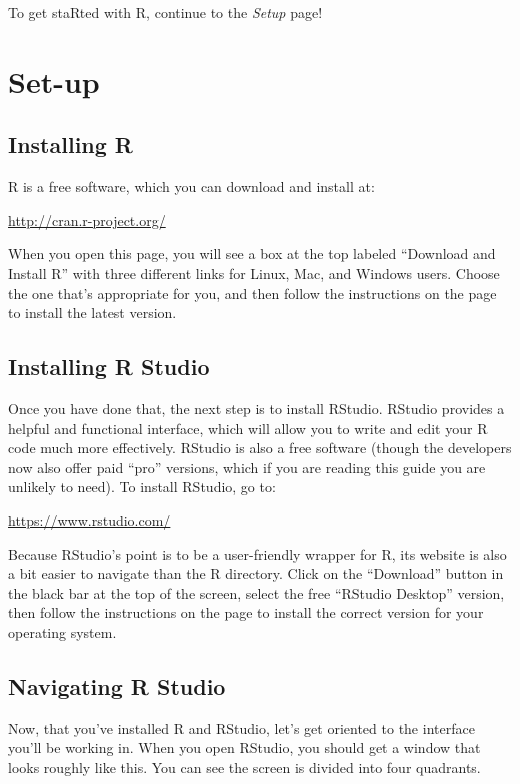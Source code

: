 \documentclass[
]{book}
\begin{document}
To get staRted with R, continue to the \emph{Setup} page!

\hypertarget{setup}{%
\chapter{Set-up}\label{setup}}

\hypertarget{installing-r}{%
\section{Installing R}\label{installing-r}}

R is a free software, which you can download and install at:

\url{http://cran.r-project.org/}

When you open this page, you will see a box at the top labeled ``Download and Install R'' with three different links for Linux, Mac, and Windows users. Choose the one that's appropriate for you, and then follow the instructions on the page to install the latest version.

\hypertarget{installing-r-studio}{%
\section{Installing R Studio}\label{installing-r-studio}}

Once you have done that, the next step is to install RStudio. RStudio provides a helpful and functional interface, which will allow you to write and edit your R code much more effectively. RStudio is also a free software (though the developers now also offer paid ``pro'' versions, which if you are reading this guide you are unlikely to need). To install RStudio, go to:

\url{https://www.rstudio.com/}

Because RStudio's point is to be a user-friendly wrapper for R, its website is also a bit easier to navigate than the R directory. Click on the ``Download'' button in the black bar at the top of the screen, select the free ``RStudio Desktop'' version, then follow the instructions on the page to install the correct version for your operating system.

\hypertarget{navigating-r-studio}{%
\section{Navigating R Studio}\label{navigating-r-studio}}

Now, that you've installed R and RStudio, let's get oriented to the interface you'll be working in. When you open RStudio, you should get a window that looks roughly like this. You can see the screen is divided into four quadrants.
\end{document}
